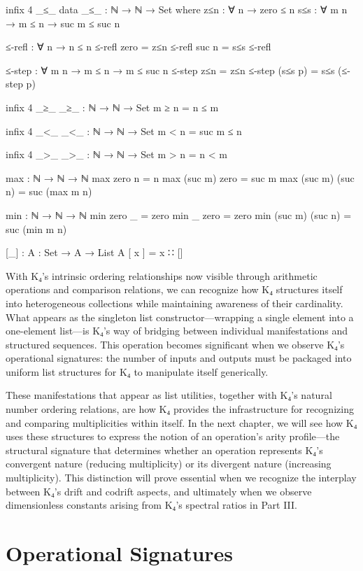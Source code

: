 \documentclass[11pt,a4paper]{book}
\begin{document}
\begin{code}
infix 4 _≤_
data _≤_ : ℕ → ℕ → Set where
  z≤n : ∀ {n} → zero ≤ n
  s≤s : ∀ {m n} → m ≤ n → suc m ≤ suc n

≤-refl : ∀ {n} → n ≤ n
≤-refl {zero}  = z≤n
≤-refl {suc n} = s≤s ≤-refl

≤-step : ∀ {m n} → m ≤ n → m ≤ suc n
≤-step z≤n = z≤n
≤-step (s≤s p) = s≤s (≤-step p)

infix 4 _≥_
_≥_ : ℕ → ℕ → Set
m ≥ n = n ≤ m

infix 4 _<_
_<_ : ℕ → ℕ → Set
m < n = suc m ≤ n

infix 4 _>_
_>_ : ℕ → ℕ → Set
m > n = n < m

max : ℕ → ℕ → ℕ
max zero  n     = n
max (suc m) zero  = suc m
max (suc m) (suc n) = suc (max m n)

min : ℕ → ℕ → ℕ
min zero  _     = zero
min _     zero  = zero
min (suc m) (suc n) = suc (min m n)

[_] : {A : Set} → A → List A
[ x ] = x ∷ []
\end{code}

With K₄'s intrinsic ordering relationships now visible through arithmetic operations and comparison relations, we can recognize how K₄ structures itself into heterogeneous collections while maintaining awareness of their cardinality. What appears as the singleton list constructor—wrapping a single element into a one-element list—is K₄'s way of bridging between individual manifestations and structured sequences. This operation becomes significant when we observe K₄'s operational signatures: the number of inputs and outputs must be packaged into uniform list structures for K₄ to manipulate itself generically.

These manifestations that appear as list utilities, together with K₄'s natural number ordering relations, are how K₄ provides the infrastructure for recognizing and comparing multiplicities within itself. In the next chapter, we will see how K₄ uses these structures to express the notion of an operation's arity profile—the structural signature that determines whether an operation represents K₄'s convergent nature (reducing multiplicity) or its divergent nature (increasing multiplicity). This distinction will prove essential when we recognize the interplay between K₄'s drift and codrift aspects, and ultimately when we observe dimensionless constants arising from K₄'s spectral ratios in Part III.

\chapter{Operational Signatures}
\end{document}
